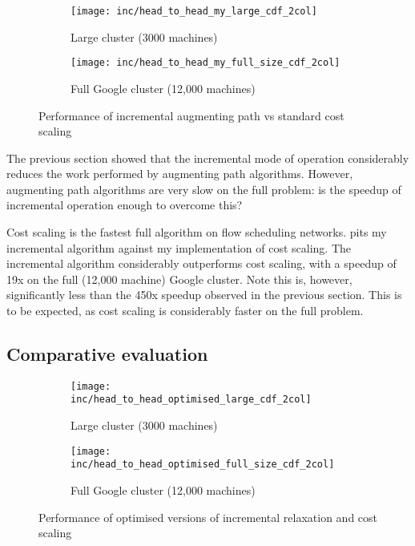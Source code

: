 \begin{figure}
    \begin{widepage}
        \begin{subfigure}[c]{0.5\textwidth}
            \texttt{[image: inc/head\_to\_head\_my\_large\_cdf\_2col]}
            \caption{Large cluster (3000 machines)}
        \end{subfigure}
        \begin{subfigure}[c]{0.5\textwidth}
            \texttt{[image: inc/head\_to\_head\_my\_full\_size\_cdf\_2col]}
            \caption{Full Google cluster (12,000 machines)}
        \end{subfigure}
    \end{widepage}
    \caption{Performance of incremental augmenting path vs standard cost scaling}
    \label{fig:inc-head-to-head-my}
\end{figure}

The previous section showed that the incremental mode of operation considerably reduces the work performed by augmenting path algorithms. However, augmenting path algorithms are very slow on the full problem\footnotemark: is the speedup of incremental operation enough to overcome this?

Cost scaling is the fastest full algorithm on flow scheduling networks.  pits my incremental algorithm against my implementation of cost scaling. The incremental algorithm considerably outperforms cost scaling, with a speedup of 19x on the full (12,000 machine) Google cluster. Note this is, however, significantly less than the 450x speedup observed in the previous section. This is to be expected, as cost scaling is considerably faster on the full problem.

\subsection{Comparative evaluation}

\begin{figure}
    \begin{widepage}
        \begin{subfigure}[c]{0.5\textwidth}
            \texttt{[image: inc/head\_to\_head\_optimised\_large\_cdf\_2col]}
            \caption{Large cluster (3000 machines)}
            \label{fig:inc-head-to-head-optimised:large}
        \end{subfigure}
        \begin{subfigure}[c]{0.5\textwidth}
            \texttt{[image: inc/head\_to\_head\_optimised\_full\_size\_cdf\_2col]}
            \caption{Full Google cluster (12,000 machines)}
            \label{fig:inc-head-to-head-optimised:full-size}
        \end{subfigure}
    \end{widepage}
    \caption{Performance of optimised versions of incremental relaxation and cost scaling}
    \label{fig:inc-head-to-head-optimised}
\end{figure}

